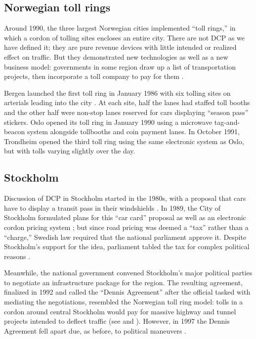 \subsection{Norwegian toll rings}

Around 1990, the three largest Norwegian cities implemented ``toll rings,'' in which a cordon of tolling sites encloses an entire city. There are not DCP as we have defined it; they are pure revenue devices with little intended or realized effect on traffic. But they demonstrated new technologies as well as a new business model: governments in some region draw up a list of transportation projects, then incorporate a toll company to pay for them \citep{Ieromonachou2006}. 

Bergen launched the first toll ring in January 1986 with six tolling sites on arterials leading into the city \citep{Ieromonachou2006,Ramjerdi2004}. At each site, half the lanes had staffed toll booths and the other half were non-stop lanes reserved for cars displaying ``season pass'' stickers. Oslo opened its toll ring in January 1990 using a microwave tag-and-beacon system alongside tollbooths and coin payment lanes. In October 1991, Trondheim opened the third toll ring using the same electronic system as Oslo, but with tolls varying slightly over the day.

 \subsection{Stockholm}

Discussion of DCP in Stockholm started in the 1980s, with a proposal that cars have to display a transit pass in their windshields \citep{GullbergIsaksson2009,Arnott2005}. In 1989, the City of Stockholm formulated plans for this ``car card'' proposal as well as an electronic cordon pricing system \citep[p. 90]{Hau1992}; but since road pricing was deemed a ``tax'' rather than a ``charge,'' Swedish law required that the national parliament approve it. Despite Stockholm's support for the idea, parliament tabled the tax for complex political reasons \citep{Ahlstrand2001}. 

Meanwhile, the national government convened Stockholm's major political parties to negotiate an infrastructure package for the region. The resulting agreement, finalized in 1992 and called the ``Dennis Agreement'' after the official tasked with mediating the negotiations, resembled the Norwegian toll ring model: tolls in a cordon around central Stockholm would pay for massive highway and tunnel projects intended to deflect traffic  (see \citet[pp. 39-40]{Gomez-Ibanez1994} and \citet[p. 92]{Hau1992}). However, in 1997  the Dennis Agreement fell apart due, as before, to political maneuvers \citep{Ahlstrand2001,GullbergIsaksson2009}.


